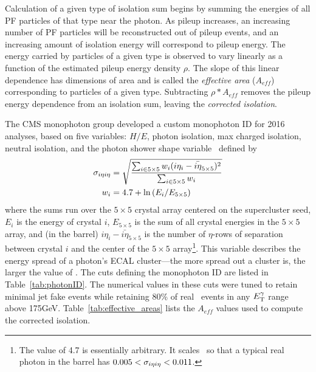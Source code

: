 Calculation of a given type of isolation sum begins by summing the energies of all PF particles of that type near the photon. As pileup increases, an increasing number of PF particles
will be reconstructed out of pileup events, and an increasing amount of isolation energy will correspond to pileup energy. The energy carried by particles of a given type is observed to vary
linearly as a function of the estimated pileup energy density $\rho$. The slope of this linear dependence has dimensions of area and is called the \textit{effective area} ($A_{eff}$)
corresponding to particles of a given type. Subtracting $\rho{*}A_{eff}$ removes the pileup energy dependence from an isolation sum, leaving the \textit{corrected isolation}.

The CMS monophoton group developed a custom monophoton ID for 2016 analyses, based on five variables: $H/E$, photon isolation, max charged isolation, neutral isolation, and the photon shower shape
variable \sieie\ defined by
\begin{equation}
\begin{gathered}
\begin{aligned}
\sigma_{i\eta i\eta} &= \sqrt{\frac{\sum_{i\in5{\times}5} w_{i}(i\eta_{i} - {\bar{i\eta}}_{5{\times}5})^{2}}{\sum_{i\in5{\times}5} w_{i}}}\\
            w_{i} &= 4.7 + \ln{(E_{i} / E_{5{\times}5})}
\end{aligned}
\end{gathered}
\label{eq:sieie}
\end{equation}
where the sums run over the $5{\times}5$ crystal array centered on the supercluster seed, $E_{i}$ is the energy of crystal $i$, $E_{5{\times}5}$ is the sum of all crystal energies
in the $5{\times}5$ array, and (in the barrel) $i\eta_{i} - {\bar{i\eta}}_{5{\times}5}$ is the number of $\eta$-rows of separation between crystal $i$ and the center of the $5{\times}5$ array\footnote{The value
of 4.7 is essentially arbitrary. It scales \sieie\ so that a typical real photon in the barrel has $0.005 < \sigma_{i\eta i\eta} < 0.011$.}. This variable
describes the energy spread of a photon's ECAL cluster---the more spread out a cluster is, the larger the value of \sieie.
The cuts defining the monophoton ID are listed in Table~\ref{tab:photonID}. The numerical values in these cuts were tuned to retain minimal jet fake events while retaining 80\% of
real \zinvg\ events in any $E_\mathrm{T}^{\gamma}$ range above 175\unit{GeV}. Table~\ref{tab:effective_areas} lists the $A_{eff}$ values used to compute the corrected isolation.


